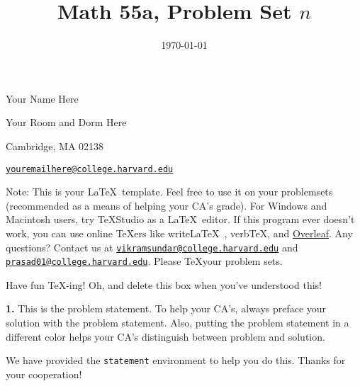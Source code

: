 \documentclass[12pt]{amsart}
\title{Math 55a, Problem Set $n$} %
\date{\today}
\newenvironment{statement}[1]{\smallskip\noindent\color[rgb]{1.00,0.00,0.50} {\bf #1.}}{}
\theoremstyle{definition}
\theoremstyle{remark}
\begin{document}
\maketitle

\vspace*{-0.25in}
\centerline{Your Name Here}
\centerline{Your Room and Dorm Here}
\centerline{Cambridge, MA 02138}
\centerline{\href{mailto:youremailhere@college.harvard.edu}{{\tt youremailhere@college.harvard.edu}}}
\vspace*{0.15in}

\begin{framed}
  Note: This is your \LaTeX~template. Feel free to use it on your problemsets (recommended as a means of helping your CA's grade). For Windows and Macintosh users, try {\TeX}Studio as a \LaTeX~editor. If this program ever doesn't work, you can use online {\TeX}ers like write\LaTeX~, verb\TeX, and \href{http://www.overleaf.com}{Overleaf}. Any questions? Contact us at \href{mailto:vikramsundar@college.harvard.edu}{{\tt vikramsundar@college.harvard.edu}} and \href{mailto:prasad01@college.harvard.edu}{{\tt prasad01@college.harvard.edu}}. Please \TeX your problem sets.

    Have fun \TeX-ing! Oh, and delete this box when you've understood this!
\end{framed}

\begin{statement}{1}
    This is the problem statement. To help your CA's, always preface your solution with the problem statement. Also, putting the problem statement in a different color helps your CA's distinguish between problem and solution. 

    We have provided the {\tt statement} environment to help you do this. Thanks for your cooperation!
\end{statement}
\end{document}
